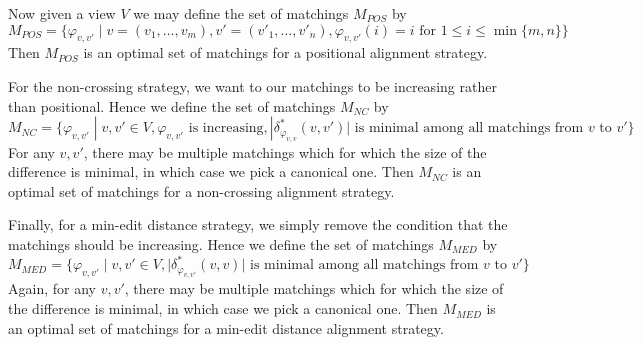 \documentclass[acmsmall,review,anonymous]{acmart}\settopmatter{printfolios=true,printccs=false,printacmref=false}
\begin{document}
Now given a view $V$ we may define the set of matchings $M_{POS}$ by 
$$M_{POS} = \{\varphi_{v, v'} \; | \; v = (v_1, \ldots, v_m), v' = (v'_1,
\ldots, v'_n), \varphi_{v, v'}(i) = i \text{ for }1 \leq i \leq \min\{m, n\}\}$$
Then $M_{POS}$ is an optimal set of matchings for a positional alignment
strategy.

For the non-crossing strategy, we want to our matchings to be increasing rather
than positional. Hence we define the set of matchings $M_{NC}$ by
$$M_{NC} = \{\varphi_{v, v'} \; | \; v, v' \in V, \varphi_{v, v'} \text{ is
increasing}, |\delta^*_{\varphi_{v, v}}(v, v')| \text{ is minimal among all
matchings from }v \text{ to }v'\}$$
For any $v, v'$, there may be multiple matchings which for which the size of the
difference is minimal, in which case we pick a canonical one. Then $M_{NC}$ is
an optimal set of matchings for a non-crossing alignment strategy.

Finally, for a min-edit distance strategy, we simply remove the condition that
the matchings should be increasing. Hence we define the set of matchings
$M_{MED}$ by
$$M_{MED} = \{\varphi_{v, v'} \; | \; v, v' \in V, |\delta^*_{\varphi_{v,
v'}}(v, v)| \text{ is minimal among all matchings from }v \text{ to }v'\}$$
Again, for any $v, v'$, there may be multiple matchings which for which the size
of the difference is minimal, in which case we pick a canonical one. Then
$M_{MED}$ is an optimal set of matchings for a min-edit distance alignment
strategy.
\end{document}
